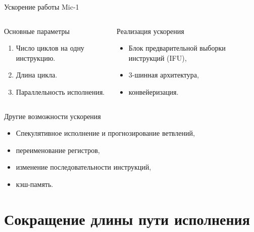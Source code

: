 \begin{frame}{Ускорение работы Mic-1}
\begin{columns}
    \column{6cm}
\begin{block}{Основные параметры}
\pause
\begin{enumerate}[<+->]
    \item Число циклов на
        одну инструкцию.
    \item Длина цикла.
    \item Параллельность исполнения.
\end{enumerate}
\end{block}

\pause
    \column{5.5cm}
\begin{block}{Реализация ускорения}
\begin{itemize}%
    \item Блок предварительной выборки инструкций (IFU),
    \item 3-шинная архитектура,
    \item конвейеризация.
\end{itemize}
\end{block}
\end{columns}

\pause
\begin{block}{Другие возможности ускорения}
\begin{itemize}[<+->]
    \item Спекулятивное исполнение и прогнозирование ветвлений,
    \item переименование регистров,
    \item изменение последовательности инструкций,
    \item кэш-память.
\end{itemize}
\end{block}
\end{frame}


\section{Сокращение длины пути исполнения}

